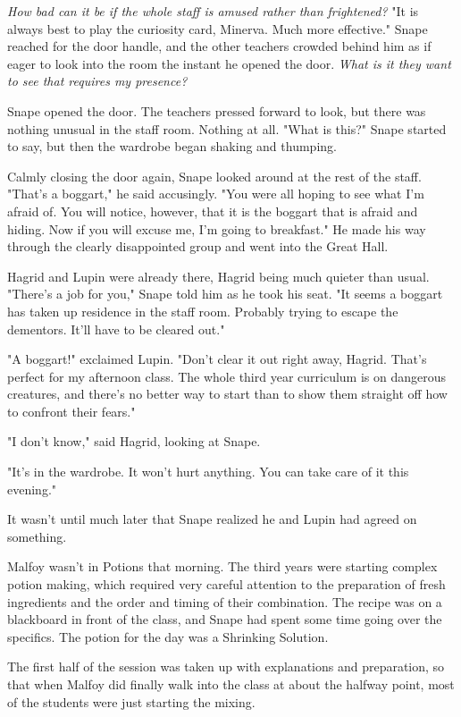 \emph{How bad can it be if the whole staff is amused rather than frightened?} "It is always best to play the curiosity card, Minerva. Much more effective." Snape reached for the door handle, and the other teachers crowded behind him as if eager to look into the room the instant he opened the door. \emph{What is it they want to see that requires my presence?}

Snape opened the door. The teachers pressed forward to look, but there was nothing unusual in the staff room. Nothing at all. "What is this?" Snape started to say, but then the wardrobe began shaking and thumping.

Calmly closing the door again, Snape looked around at the rest of the staff. "That's a boggart," he said accusingly. "You were all hoping to see what I'm afraid of. You will notice, however, that it is the boggart that is afraid and hiding. Now if you will excuse me, I'm going to breakfast." He made his way through the clearly disappointed group and went into the Great Hall.

Hagrid and Lupin were already there, Hagrid being much quieter than usual. "There's a job for you," Snape told him as he took his seat. "It seems a boggart has taken up residence in the staff room. Probably trying to escape the dementors. It'll have to be cleared out."

"A boggart!" exclaimed Lupin. "Don't clear it out right away, Hagrid. That's perfect for my afternoon class. The whole third year curriculum is on dangerous creatures, and there's no better way to start than to show them straight off how to confront their fears."

"I don't know," said Hagrid, looking at Snape.

"It's in the wardrobe. It won't hurt anything. You can take care of it this evening."

It wasn't until much later that Snape realized he and Lupin had agreed on something.

Malfoy wasn't in Potions that morning. The third years were starting complex potion making, which required very careful attention to the preparation of fresh ingredients and the order and timing of their combination. The recipe was on a blackboard in front of the class, and Snape had spent some time going over the specifics. The potion for the day was a Shrinking Solution.

The first half of the session was taken up with explanations and preparation, so that when Malfoy did finally walk into the class at about the halfway point, most of the students were just starting the mixing.

